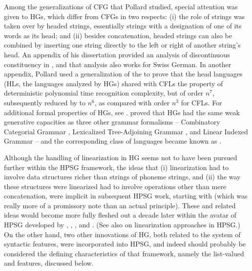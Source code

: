 \documentclass[output=paper
 	        ,biblatex
                ,babelshorthands
                ,newtxmath
                ,draftmode
                ,colorlinks, citecolor=brown
]{langscibook}
\begin{document}
Among the generalizations of CFG that Pollard studied, special attention was given to HGs, which
differ from CFGs in two respects: (i) the role of strings was taken over by headed strings,
essentially strings with a designation of one of its words as its head; and (ii) besides
concatenation, headed strings can also be combined by inserting one string directly to the left or
right of another string's head. An appendix of his dissertation \citep[Appendix~1]{Pollard84a-u}
provided an analysis of discontinuous constituency in , and that analysis also works for
Swiss German. In another appendix, Pollard used a generalization of the  to prove that the head languages (HLs, the languages analyzed by HGs) shared with CFLs
the property of deterministic polynomial time recognition complexity, but of order $n^{7}$,
subsequently reduced by \citet*{Kasamietal1989} to $n^{6}$, as compared with order $n^{3}$ for
CFLs. For additional formal properties of HGs, see \citet{Roach1987}. \citet{VijayWeir1994} proved
that HGs had the same weak generative capacities as three other grammar formalisms -- Combinatory
Categorial Grammar \citep{Steedman87a-u,Steedman90a-u}, Lexicalized Tree-Adjoining Grammar
\citep{Shabes90}, and Linear Indexed Grammar \citep{Gazdar88a-u} -- and the corresponding class of
languages became known as \emph{}.

Although the handling of linearization in HG seems not to have been pursued further within the HPSG
framework, the ideas that (i) linearization had to involve data structures richer than strings of
phoneme strings, and (ii) the way these structures were linearized had to involve operations other
than mere concatenation, were implicit in subsequent HPSG work, starting with   (which was really more of a promissory note than an
actual principle).  These and related ideas would become more fully fleshed out a decade later
within the  avatar of HPSG developed by \citet{Reape90a},
\citet{Reape92a}, \citet{Kathol95a,Kathol2000a}, and
\citet{Mueller95c,Babel,Mueller99a,Mueller2004b}. (See also
 on linearization approaches in HPSG.) On the
other hand, two other innovations of HG, both related to the system of syntactic features, were
incorporated into HPSG, and indeed should probably be considered the defining characteristics of
that framework, namely the list-valued \subcat and \slasch features, discussed below.
\end{document}
